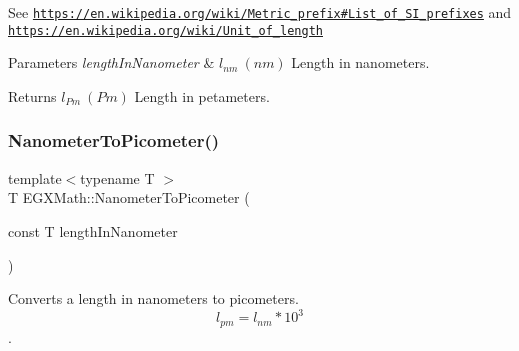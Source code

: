 See \href{https://en.wikipedia.org/wiki/Metric_prefix#List_of_SI_prefixes}{\tt https\+://en.\+wikipedia.\+org/wiki/\+Metric\+\_\+prefix\#\+List\+\_\+of\+\_\+\+S\+I\+\_\+prefixes} and \href{https://en.wikipedia.org/wiki/Unit_of_length}{\tt https\+://en.\+wikipedia.\+org/wiki/\+Unit\+\_\+of\+\_\+length} 
\begin{DoxyParams}{Parameters}
{\em length\+In\+Nanometer} & $ l_{nm}\ (nm)$ Length in nanometers. \\
\hline
\end{DoxyParams}
\begin{DoxyReturn}{Returns}
$ l_{Pm}\ (Pm)$ Length in petameters. 
\end{DoxyReturn}
\mbox{\label{group___e_g_x_math-_conversions-_length_conversions-_nanometer-_s_i_gaba1e9bf91f6e065f8ba8be8dd039b499}} 
\subsubsection{\texorpdfstring{Nanometer\+To\+Picometer()}{NanometerToPicometer()}}
{\footnotesize\ttfamily template$<$typename T $>$ \\
T E\+G\+X\+Math\+::\+Nanometer\+To\+Picometer (\begin{DoxyParamCaption}\item[{const T}]{length\+In\+Nanometer }\end{DoxyParamCaption})}



Converts a length in nanometers to picometers. \[ l_{pm}=l_{nm} * 10^{3} \]. 

